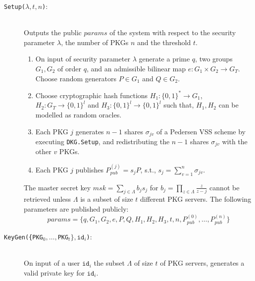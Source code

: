 \documentclass[journal]{IEEEtran}
\newcommand{\id}[1]{\ensuremath{\mathtt{id}_{#1}}}
\begin{document}
\begin{description}
    \item[\texttt{Setup($\lambda, t, n$)}:]~\\ Outputs the public $params$ of the system with respect to the security parameter $\lambda$, the number of PKGs $n$ and the threshold $t$.
    \begin{enumerate}
        \item On input of security parameter $\lambda$ generate a prime $q$, two groups $G_1, G_2$ of order $q$, and an admissible bilinear map $e: G_1 \times G_2 \rightarrow G_T$. Choose random generators $P \in G_1$ and $Q \in G_2$. 
    
        \item Choose cryptographic hash functions $H_1: \{ 0,1 \}^{*} \rightarrow G_1$, ${H_2: G_T \rightarrow \{ 0,1 \}^{l}}$ and $H_3: \{ 0, 1 \}^{l} \rightarrow \{ 0,1 \}^{l}$ such that, $H_1, H_2$ can be modelled as random oracles.
        
        \item Each PKG $j$ generates $n-1$ shares $\sigma_{jv}$ of a Pedersen VSS scheme by executing \texttt{DKG.Setup}, and redistributing the $n-1$ shares $\sigma_{jv}$ with the other $v$ PKGs.

        \item Each PKG $j$ publishes $P_{pub}^{(j)} = s_j P$, s.t., $s_j=\sum_{v=1}^n \sigma_{jv}$.
    \end{enumerate}
    
    The master secret key $msk = \sum_{j \in \Lambda} b_j s_j$ for $b_j = \prod_{z \in \Lambda} \frac{z}{z-j}$ cannot be retrieved unless $\Lambda$ is a subset of size $t$ different PKG servers. The following parameters are published publicly:
    \begin{equation*}
    params = \{ q, G_1, G_2, e, P, Q, H_1, H_2, H_3, t, n, P_{pub}^{(0)}, \ldots, P_{pub}^{(n)} \}
    \end{equation*}
    
    \bigskip

    \item[\texttt{KeyGen(\{PKG$_0,\ldots,$PKG$_t\}, \id{i}$)}:]~\\ On input of a user $\id{i}$ the subset $\Lambda$ of size $t$ of PKG servers, generates a valid private key for \id{i}. 
    

\end{description}
\end{document}

